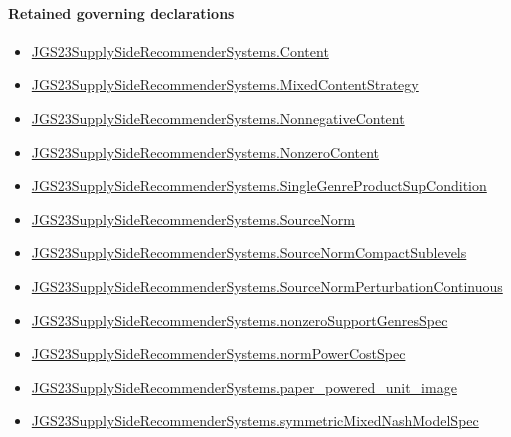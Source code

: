 \documentclass[10pt]{article}
\begin{document}
\paragraph{Retained governing declarations}
\begin{itemize}\raggedright
\item \hyperlink{governing-declaration-367305fda50f0ada}{JGS23\allowbreak{}Supply\allowbreak{}Side\allowbreak{}Recommender\allowbreak{}Systems.\allowbreak{}Content}
\item \hyperlink{governing-declaration-2089965d06cf0282}{JGS23\allowbreak{}Supply\allowbreak{}Side\allowbreak{}Recommender\allowbreak{}Systems.\allowbreak{}Mixed\allowbreak{}Content\allowbreak{}Strategy}
\item \hyperlink{governing-declaration-d426babe40b9593c}{JGS23\allowbreak{}Supply\allowbreak{}Side\allowbreak{}Recommender\allowbreak{}Systems.\allowbreak{}Nonnegative\allowbreak{}Content}
\item \hyperlink{governing-declaration-90e2ac7d13788c50}{JGS23\allowbreak{}Supply\allowbreak{}Side\allowbreak{}Recommender\allowbreak{}Systems.\allowbreak{}Nonzero\allowbreak{}Content}
\item \hyperlink{governing-declaration-c26bf983a5931de7}{JGS23\allowbreak{}Supply\allowbreak{}Side\allowbreak{}Recommender\allowbreak{}Systems.\allowbreak{}Single\allowbreak{}Genre\allowbreak{}Product\allowbreak{}Sup\allowbreak{}Condition}
\item \hyperlink{governing-declaration-6141339a5d3412d9}{JGS23\allowbreak{}Supply\allowbreak{}Side\allowbreak{}Recommender\allowbreak{}Systems.\allowbreak{}Source\allowbreak{}Norm}
\item \hyperlink{governing-declaration-0d92048317064110}{JGS23\allowbreak{}Supply\allowbreak{}Side\allowbreak{}Recommender\allowbreak{}Systems.\allowbreak{}Source\allowbreak{}Norm\allowbreak{}Compact\allowbreak{}Sublevels}
\item \hyperlink{governing-declaration-6ccc463be39b315f}{JGS23\allowbreak{}Supply\allowbreak{}Side\allowbreak{}Recommender\allowbreak{}Systems.\allowbreak{}Source\allowbreak{}Norm\allowbreak{}Perturbation\allowbreak{}Continuous}
\item \hyperlink{governing-declaration-588c7a0b2af225d7}{JGS23\allowbreak{}Supply\allowbreak{}Side\allowbreak{}Recommender\allowbreak{}Systems.\allowbreak{}nonzero\allowbreak{}Support\allowbreak{}Genres\allowbreak{}Spec}
\item \hyperlink{governing-declaration-6ba13dc1cae95e6e}{JGS23\allowbreak{}Supply\allowbreak{}Side\allowbreak{}Recommender\allowbreak{}Systems.\allowbreak{}norm\allowbreak{}Power\allowbreak{}Cost\allowbreak{}Spec}
\item \hyperlink{governing-declaration-41ef1ed062d142a1}{JGS23\allowbreak{}Supply\allowbreak{}Side\allowbreak{}Recommender\allowbreak{}Systems.\allowbreak{}paper\_\allowbreak{}powered\_\allowbreak{}unit\_\allowbreak{}image}
\item \hyperlink{paper-prerequisite-b412efba7deb757f}{JGS23\allowbreak{}Supply\allowbreak{}Side\allowbreak{}Recommender\allowbreak{}Systems.\allowbreak{}symmetric\allowbreak{}Mixed\allowbreak{}Nash\allowbreak{}Model\allowbreak{}Spec}
\end{itemize}
\end{document}
